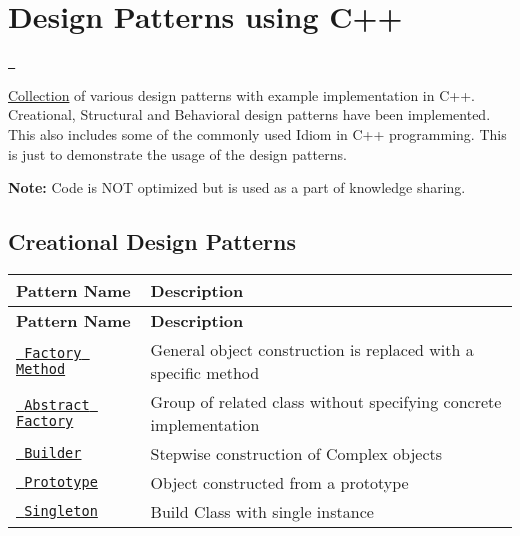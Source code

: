 

\section*{Design Patterns using C++}

\href{https://ci.appveyor.com/project/jayavardhanravi/designpatterns}{\texttt{ }}  

\mbox{\hyperlink{class_collection}{Collection}} of various design patterns with example implementation in C++. Creational, Structural and Behavioral design patterns have been implemented. This also includes some of the commonly used Idiom in C++ programming. This is just to demonstrate the usage of the design patterns.

{\bfseries{Note\+:}} Code is N\+OT optimized but is used as a part of knowledge sharing.

\subsection*{Creational Design Patterns}

\tabulinesep=1mm
\begin{longtabu}spread 0pt [c]{*{2}{|X[-1]}|}
\hline
\cellcolor{\tableheadbgcolor}\textbf{ Pattern Name  }&\cellcolor{\tableheadbgcolor}\textbf{ Description   }\\
\endfirsthead
\hline
\endfoot
\hline
\cellcolor{\tableheadbgcolor}\textbf{ Pattern Name  }&\cellcolor{\tableheadbgcolor}\textbf{ Description   }\\
\endhead
\href{https://github.com/jayavardhanravi/DesignPatterns/tree/master/FactoryMethod}{\texttt{ Factory Method}}  &General object construction is replaced with a specific method   \\
\href{https://github.com/jayavardhanravi/DesignPatterns/tree/master/AbstractFactory}{\texttt{ Abstract Factory}}  &Group of related class without specifying concrete implementation   \\
\href{https://github.com/jayavardhanravi/DesignPatterns/tree/master/Builder}{\texttt{ Builder}}  &Stepwise construction of Complex objects   \\
\href{https://github.com/jayavardhanravi/DesignPatterns/tree/master/Prototype}{\texttt{ Prototype}}  &Object constructed from a prototype   \\
\href{https://github.com/jayavardhanravi/DesignPatterns/tree/master/Singleton}{\texttt{ Singleton}}  &Build Class with single instance   \\
\end{longtabu}


